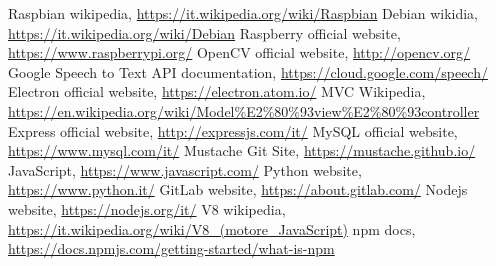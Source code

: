\begin{thebibliography}{99}
\raggedright
 Raspbian wikipedia, \url{https://it.wikipedia.org/wiki/Raspbian}
 Debian wikidia, \url{https://it.wikipedia.org/wiki/Debian}
 Raspberry official website, \url{https://www.raspberrypi.org/}
 OpenCV official website, \url{http://opencv.org/}
 Google Speech to Text API documentation, \url{https://cloud.google.com/speech/}
 Electron official website, \url{https://electron.atom.io/}
 MVC Wikipedia, \url{https://en.wikipedia.org/wiki/Model%E2%80%93view%E2%80%93controller}
 Express official website, \url{http://expressjs.com/it/}
 MySQL official website, \url{https://www.mysql.com/it/}
 Mustache Git Site, \url{https://mustache.github.io/}
 JavaScript, \url{https://www.javascript.com/}
 Python website, \url{https://www.python.it/}
 GitLab website, \url{https://about.gitlab.com/}
 Nodejs website, \url{https://nodejs.org/it/}
 V8 wikipedia, \url{https://it.wikipedia.org/wiki/V8_(motore_JavaScript)}
 npm docs, \url{https://docs.npmjs.com/getting-started/what-is-npm}


\end{thebibliography}
